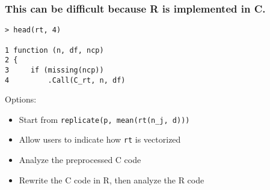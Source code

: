 \documentclass{beamer}
\begin{document}
\begin{frame}[fragile]

    \frametitle{This can be difficult because R is implemented in C.}

\begin{verbatim}
> head(rt, 4)

1 function (n, df, ncp)
2 {
3     if (missing(ncp))
4         .Call(C_rt, n, df)
\end{verbatim}

\pause

    Options:

    \begin{itemize}
        \item Start from \texttt{replicate(p, mean(rt(n\_j, d)))}
        \item Allow users to indicate how \texttt{rt} is vectorized
        \item Analyze the preprocessed C code
        \item Rewrite the C code in R, then analyze the R code
    \end{itemize}

\end{frame}
\end{document}
